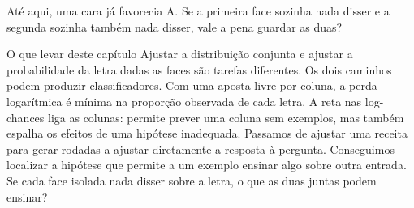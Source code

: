 Até aqui, uma cara já favorecia A. Se a primeira face sozinha nada disser e a segunda sozinha também nada disser, vale a pena guardar as duas?

\begin{quadro}{O que levar deste capítulo}
 Ajustar a distribuição conjunta e ajustar a probabilidade da letra dadas as faces são tarefas diferentes. Os dois caminhos podem produzir classificadores.
 Com uma aposta livre por coluna, a perda logarítmica é mínima na proporção observada de cada letra.
 A reta nas log-chances liga as colunas: permite prever uma coluna sem exemplos, mas também espalha os efeitos de uma hipótese inadequada.
 Passamos de ajustar uma receita para gerar rodadas a ajustar diretamente a resposta à pergunta. Conseguimos localizar a hipótese que permite a um exemplo ensinar algo sobre outra entrada.
 Se cada face isolada nada disser sobre a letra, o que as duas juntas podem ensinar?
\end{quadro}
